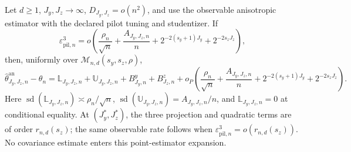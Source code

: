 Let \(d\ge1\), \(J_y,J_z\to\infty\), \(D_{J_y,J_z}=o(n^2)\), and use the observable anisotropic estimator with the declared pilot tuning and studentizer. If
\[
\varepsilon_{\mathrm{pil},n}^3=o\!\left(\frac{\rho_n}{\sqrt n}+\frac{A_{J_y,J_z,n}}n+2^{-2(s_y+1)J_y}+2^{-2s_zJ_z}\right),
\]
then, uniformly over \(\mathcal M_{n,d}(s_y,s_z,\rho)\),
\[
\widehat\theta^{\mathrm{an}}_{J_y,J_z,n}-\theta_n=\mathbb L_{J_y,J_z,n}+\mathbb U_{J_y,J_z,n}+B^y_{J_y,n}+B^z_{J_z,n}+o_P\!\left(\frac{\rho_n}{\sqrt n}+\frac{A_{J_y,J_z,n}}n+2^{-2(s_y+1)J_y}+2^{-2s_zJ_z}\right).
\]
Here \(\operatorname{sd}(\mathbb L_{J_y,J_z,n})\asymp\rho_n/\sqrt n\), \(\operatorname{sd}(\mathbb U_{J_y,J_z,n})=A_{J_y,J_z,n}/n\), and \(\mathbb L_{J_y,J_z,n}=0\) at conditional equality. At \((J_y^*,J_z^*)\), the three projection and quadratic terms are of order \(r_{n,d}(s_z)\); the same observable rate follows when \(\varepsilon_{\mathrm{pil},n}^3=o(r_{n,d}(s_z))\). No covariance estimate enters this point-estimator expansion.